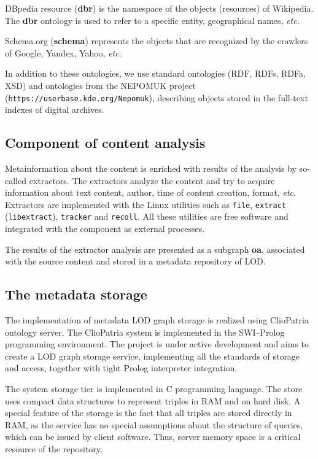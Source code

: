 \documentclass[conference,a4paper]{IEEEtran}
\providecommand\url[1]{\texttt{#1}}
\begin{document}
DBpedia resource (\textbf{dbr}) is the namespace of the objects (resources) of Wikipedia.  The \textbf{dbr} ontology is used to refer to a specific entity, geographical names, \emph{etc}.

Schema.org (\textbf{schema}) represents the objects that are recognized by the crawlers of Google, Yandex, Yahoo, \emph{etc}.

In addition to these ontologies, we use standard ontologies (RDF, RDFs, RDFa, XSD) and ontologies from the NEPOMUK project (\url{https://userbase.kde.org/Nepomuk}), describing objects stored in the full-text indexes of digital archives.

\subsection{Component of content analysis}

Metainformation about the content is enriched with results of the analysis by so-called extractors. The extractors analyze the content and try to acquire information about text content, author, time of content creation, format, \emph{etc}. Extractors are implemented with the Linux utilities such as \texttt{file}, \texttt{extract} (\texttt{libextract}), \texttt{tracker} and \texttt{recoll}.  All these utilities are free software and integrated with the component as external processes.

The results of the extractor analysis are presented as a subgraph \textbf{oa}, associated with the source content and stored in a metadata repository of LOD.

\subsection{The metadata storage}

The implementation of metadata LOD graph storage is realized using ClioPatria \cite{b8} ontology server.  The ClioPatria system is implemented in the SWI--Prolog programming environment.  The project is under active development and aims to create a LOD graph storage service, implementing all the standards of storage and access, together with tight Prolog interpreter integration.

The system storage tier is implemented in C programming language.  The store uses compact data structures to represent triples in RAM and on hard disk.  A special feature of the storage is the fact that all triples are stored directly in RAM, as the service has no special assumptions about the structure of queries, which can be issued by client software.  Thus, server memory space is a critical resource of the repository.
\end{document}
